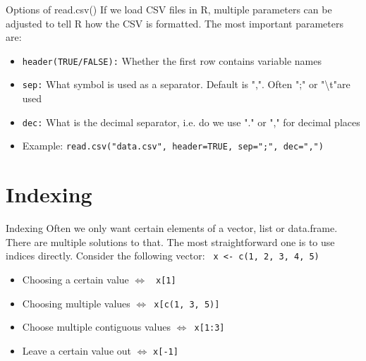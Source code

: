 \documentclass[xcolor=dvipsnames, aspectratio = 169]{beamer}
\begin{document}
\begin{frame}[fragile]{Options of read.csv()}
If we load CSV files in R, multiple parameters can be adjusted to tell R how the CSV is formatted. The most important parameters are:
  \begin{itemize}
	  \item \verb+header(TRUE/FALSE):+ Whether the first row contains variable names
	  \item \verb+sep:+ What symbol is used as a separator. Default is ",". Often ";" or "\textbackslash t"are used
	  \item \verb+dec:+ What is the decimal separator, i.e. do we use "." or "," for decimal places
	  \item	Example: \verb+read.csv("data.csv", header=TRUE, sep=";", dec=",")+
  \end{itemize}
\end{frame}

\section{Indexing}
\begin{frame}[fragile]{Indexing}
	Often we only want certain elements of a vector, list or data.frame. There are multiple solutions to that. The most straightforward one is to use indices directly. Consider the following vector: \verb+ x <- c(1, 2, 3, 4, 5) +
	\begin{itemize}
		\item Choosing a certain value $\Leftrightarrow$ \verb+ x[1]+
		\item  Choosing multiple values $\Leftrightarrow$\verb+ x[c(1, 3, 5)]+
		\item  Choose multiple contiguous values $\Leftrightarrow$\verb+ x[1:3]+
		\item  Leave a certain value out $\Leftrightarrow$ \verb+x[-1]+
	\end{itemize}
\end{frame}
\end{document}

